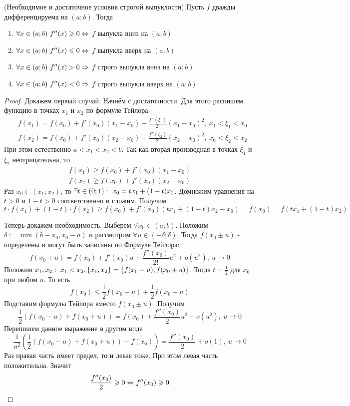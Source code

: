 \begin{theorem} (Необходимое и достаточное условия строгой выпуклости)
	Пусть $f$ дважды дифференцируема на $(a; b)$. Тогда
	\begin{enumerate}
		\item $\forall x \in (a; b)\ f''(x) \geqslant 0 \Leftrightarrow$ $f$ выпукла вниз на $(a; b)$
		
		\item $\forall x \in (a; b)\ f''(x) \leqslant 0 \Leftrightarrow$ $f$ выпукла вверх на $(a; b)$
		
		\item $\forall x \in (a; b)\ f''(x) > 0 \Rightarrow$ $f$ строго выпукла вниз на $(a; b)$
		
		\item $\forall x \in (a; b)\ f''(x) < 0 \Rightarrow$ $f$ строго выпукла вверх на $(a; b)$
	\end{enumerate}
\end{theorem}

\begin{proof}
	Докажем первый случай. Начнём с достаточности. Для этого распишем функцию в точках $x_1$ и $x_2$ по формуле Тейлора:
	\begin{align*}
		&f(x_1) = f(x_0) + f'(x_0)(x_1 - x_0) + \frac{f''(\xi_1)}{2!}(x_1 - x_0)^2,\ x_1 < \xi_1 < x_0
		\\
		&f(x_2) = f(x_0) + f'(x_0)(x_2 - x_0) + \frac{f''(\xi_2)}{2!}(x_2 - x_0)^2,\ x_0 < \xi_2 < x_2
	\end{align*}
	При этом естественно $a < x_1 < x_2 < b$. Так как вторая производная в точках $\xi_1$ и $\xi_2$ неотрицательна, то
	\begin{align*}
		f(x_1) \ge f(x_0) + f'(x_0)(x_1 - x_0)
		\\
		f(x_2) \ge f(x_0) + f'(x_0)(x_2 - x_0)
	\end{align*}
	Раз $x_0 \in (x_1; x_2)$, то $\exists t \in (0; 1) :\  x_0 = tx_1 + (1 - t)x_2$. Домножим уравнения на $t > 0$ и $1 - t > 0$ соответственно и сложим. Получим
	\[
		t \cdot f(x_1) + (1 - t) \cdot f(x_2) \ge f(x_0) + f'(x_0)\left(tx_1 + (1 - t)x_2 - x_0\right) = f(x_0) = f(tx_1 + (1 - t)x_2)
	\]
	
	Теперь докажем необходимость. Выберем $\forall x_0 \in (a; b)$. Положим $\delta := \min(b - x_0, x_0 - a)$ и рассмотрим $\forall u \in (-\delta; \delta)$. Тогда $f(x_0 \pm u)$ - определены и могут быть записаны по Формуле Тейлора:
	\[
		f(x_0 \pm u) = f(x_0) \pm f'(x_0)u + \frac{f''(x_0)}{2!}u^2 + o(u^2),\ u \to 0
	\]
	Положим $x_1, x_2 :\  x_1 < x_2, \{x_1, x_2\} = \{f(x_0 - u), f(x_0 + u)\}$. Тогда $t = \frac{1}{2}$ для $x_0$ при любом $u$. То есть
	\[
		f(x_0) \le \frac{1}{2}f(x_0 - u) + \frac{1}{2}f(x_0 + u)
	\]
	Подставим формулы Тейлора вместо $f(x_0 \pm u)$. Получим
	\[
		\frac{1}{2}\left(f(x_0 - u) + f(x_0 + u)\right) = f(x_0) + \frac{f''(x_0)}{2}u^2 + o(u^2),\ u \to 0
	\]
	Перепишем данное выражение в другом виде
	\[
		\frac{1}{u^2}\left(\frac{1}{2}\left(f(x_0 - u) + f(x_0 + u)\right) - f(x_0)\right) = \frac{f''(x_0)}{2} + o(1),\ u \to 0
	\]
	Раз правая часть имеет предел, то и левая тоже. При этом левая часть положительна. Значит
	\[
		\frac{f''(x_0)}{2} \geqslant 0 \Leftrightarrow f''(x_0) \geqslant 0
	\]
\end{proof}


